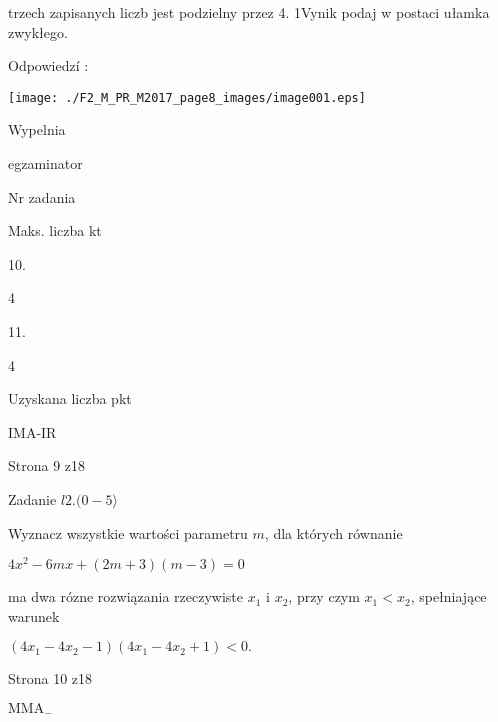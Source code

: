 \documentclass[a4paper,12pt]{article}
\begin{document}
trzech zapisanych liczb jest podzielny przez 4. 1Vynik podaj w postaci ułamka zwykłego.

Odpowiedzí :
\begin{center}
\texttt{[image: ./F2\_M\_PR\_M2017\_page8\_images/image001.eps]}
\end{center}
Wypelnia

egzaminator

Nr zadania

Maks. liczba kt

10.

4

11.

4

Uzyskana liczba pkt

IMA-IR

Strona 9 z18





Zadanie $ l2.(0-5\rangle$

Wyznacz wszystkie wartości parametru $m$, dla których równanie

$4x^{2}-6mx+(2m+3)(m-3)=0$

ma dwa rózne rozwiązania rzeczywiste $x_{1}$ i $x_{2}$, przy czym $x_{1}<x_{2}$, spełniające warunek

$(4x_{1}-4x_{2}-1)(4x_{1}-4x_{2}+1)<0.$

Strona 10 z18

$\mathrm{M}\mathrm{M}\mathrm{A}_{-}$
\end{document}
